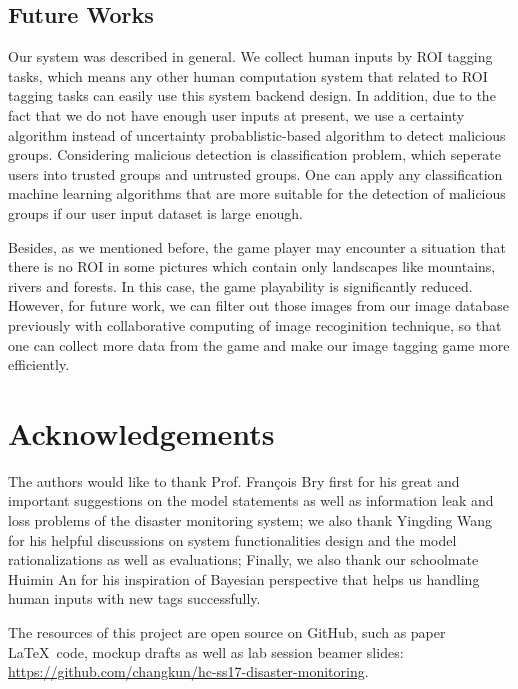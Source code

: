 \subsection{Future Works}

Our system was described in general. We collect human inputs by ROI tagging tasks, 
which means any other human computation system that related to ROI tagging tasks can easily use this system backend design.
In addition, due to the fact that we do not have enough user inputs at present, 
we use a certainty algorithm instead of uncertainty probablistic-based algorithm to detect malicious groups. 
Considering malicious detection is classification problem, which seperate users into trusted groups and untrusted groups. 
One can apply any classification machine learning algorithms that are more suitable for the detection of malicious groups 
if our user input dataset is large enough.

Besides, as we mentioned before, the game player may encounter a situation that 
there is no ROI in some pictures which contain only landscapes like mountains, rivers and forests.
In this case, the game playability is significantly reduced. However, for future work,
we can filter out those images from our image database previously with collaborative computing of image recoginition technique,
so that one can collect more data from the game and make our image tagging game more efficiently.

\section*{Acknowledgements}
The authors would like to thank Prof. Fran\c{c}ois Bry first for
his great and important suggestions on the model statements 
as well as information leak and loss problems of the disaster monitoring system;
we also thank Yingding Wang for his helpful discussions on system functionalities design 
and the model rationalizations as well as evaluations;
Finally, we also thank our schoolmate Huimin An for his inspiration of Bayesian perspective that
helps us handling human inputs with new tags successfully.

The resources of this project are open source on GitHub, such as paper \LaTeX~code, mockup drafts as well as
lab session beamer slides: \\
\url{https://github.com/changkun/hc-ss17-disaster-monitoring}.
